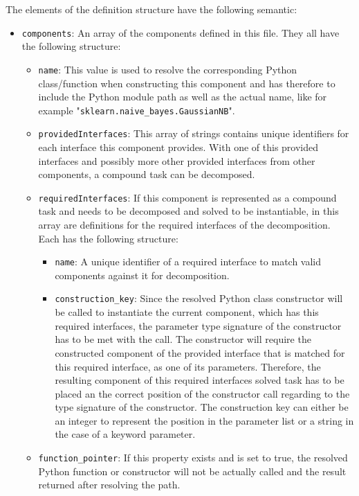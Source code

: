 The elements of the definition structure have the following semantic:
\begin{itemize}
	\item \texttt{components}: An array of the components defined in this file. They all have the following structure:
		\begin{itemize}[label=\textbullet]
			\item \texttt{name}: This value is used to resolve the corresponding Python class/function when constructing this component and has therefore to include the Python module path as well as the actual name, like for example "\texttt{sklearn.naive\_bayes.GaussianNB}".
			\item \texttt{providedInterfaces}: This array of strings contains unique identifiers for each interface this component provides. With one of this provided interfaces and possibly more other provided interfaces from other components, a compound task can be decomposed. 
            \item \texttt{requiredInterfaces}: If this component is represented as a compound task and needs to be decomposed and solved to be instantiable, in this array are definitions for the required interfaces of the decomposition. Each has the following structure:
            \begin{itemize}[label=\textbullet]
                \item \texttt{name}: A unique identifier of a required interface to match valid components against it for decomposition.
                \item \texttt{construction\_key}: Since the resolved Python class constructor will be called to instantiate the current component, which has this required interfaces, the parameter type signature of the constructor has to be met with the call.
                    The constructor will require the constructed component of the provided interface that is matched for this required interface, as one of its parameters.
                    Therefore, the resulting component of this required interfaces solved task has to be placed an the correct position of the constructor call regarding to the type signature of the constructor.
                    The construction key can either be an integer to represent the position in the parameter list or a string in the case of a keyword parameter. 
            \end{itemize}
            \item \texttt{function\_pointer}: If this property exists and is set to true, the resolved Python function or constructor will not be actually called and the result returned after resolving the path.

\end{itemize}
\end{itemize}
